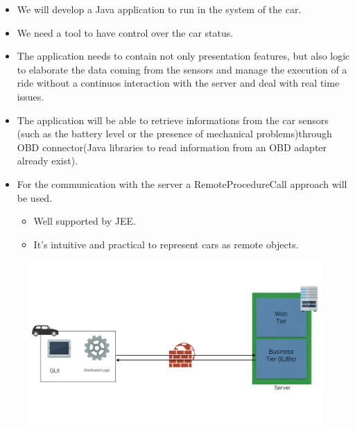 \documentclass[]{article}
\providecommand{\tightlist}{%
  \setlength{\itemsep}{0pt}\setlength{\parskip}{0pt}}
\begin{document}
\begin{itemize}
\item
  We will develop a Java application to run in the system of the car.
\item
  We need a tool to have control over the car status.
\item
  The application needs to contain not only presentation features, but
  also logic to elaborate the data coming from the sensors and manage
  the execution of a ride without a continuos interaction with the
  server and deal with real time issues.
\item
  The application will be able to retrieve informations from the car
  sensors (such as the battery level or the presence of mechanical
  problems)through OBD connector(Java libraries to read information from
  an OBD adapter already exist).
\item
  For the communication with the server a RemoteProcedureCall approach
  will be used.

  \begin{itemize}
  \tightlist
  \item
    Well supported by JEE.
  \item
    It's intuitive and practical to represent cars as remote objects.
  \end{itemize}
\end{itemize}

\begin{figure}[htbp]
\centering
\includegraphics[width=1.00000\textwidth,height=1.00000\textwidth]{./images/carAppArch.png}
\caption{}\label{id}
\end{figure}
\end{document}
